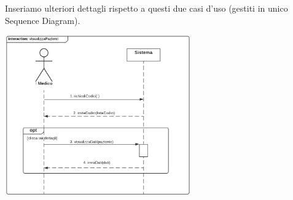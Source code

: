 \documentclass{article}
\begin{document}
Inseriamo ulteriori dettagli rispetto a questi due casi d'uso (gestiti in unico Sequence Diagram).
\begin{center}
    \includegraphics[width=0.6\textwidth]{pictures/SDMedico2_listaPazienti.png}
\end{center}
\end{document}
